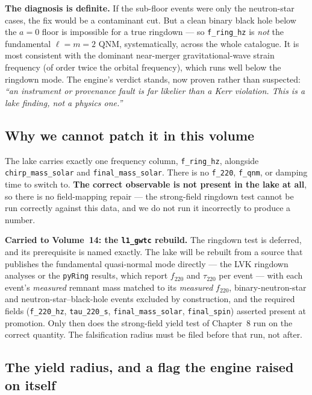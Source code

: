 \documentclass[11pt, letterpaper, openany]{book}
\begin{document}
\begin{signalbox}
\textbf{The diagnosis is definite.} If the sub-floor events were only the neutron-star cases, the
fix would be a contaminant cut. But a clean binary black hole below the $a=0$ floor is impossible
for a true ringdown --- so \texttt{f\_ring\_hz} is \emph{not} the fundamental $\ell = m = 2$ QNM,
systematically, across the whole catalogue. It is most consistent with the dominant
near-merger gravitational-wave strain frequency (of order twice the orbital frequency), which runs
well below the ringdown mode. The engine's verdict stands, now proven rather than suspected:
\emph{``an instrument or provenance fault is far likelier than a Kerr violation. This is a lake
finding, not a physics one.''}
\end{signalbox}

\subsection{Why we cannot patch it in this volume}

The lake carries exactly one frequency column, \texttt{f\_ring\_hz}, alongside
\texttt{chirp\_mass\_solar} and \texttt{final\_mass\_solar}. There is no \texttt{f\_220},
\texttt{f\_qnm}, or damping time to switch to. \textbf{The correct observable is not present in the
lake at all}, so there is no field-mapping repair --- the strong-field ringdown test cannot be run
correctly against this data, and we do not run it incorrectly to produce a number.

\begin{predictionbox}
\textbf{Carried to Volume~14: the \texttt{l1\_gwtc} rebuild.} The ringdown test is deferred, and
its prerequisite is named exactly. The lake will be rebuilt from a source that publishes the
fundamental quasi-normal mode directly --- the LVK ringdown analyses or the \texttt{pyRing} results,
which report $f_{220}$ and $\tau_{220}$ per event --- with each event's \emph{measured} remnant
mass matched to its \emph{measured} $f_{220}$, binary-neutron-star and neutron-star--black-hole
events excluded by construction, and the required fields (\texttt{f\_220\_hz},
\texttt{tau\_220\_s}, \texttt{final\_mass\_solar}, \texttt{final\_spin}) asserted present at
promotion. Only then does the strong-field yield test of Chapter~8 run on the correct quantity.
The falsification radius must be filed before that run, not after.
\end{predictionbox}

\subsection{The yield radius, and a flag the engine raised on itself}
\end{document}
